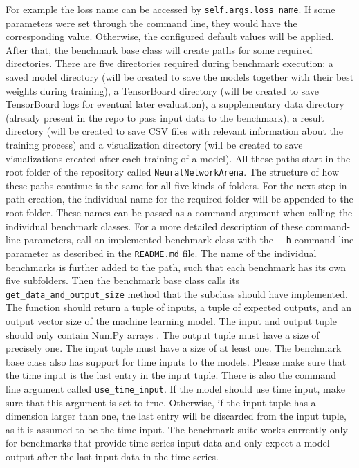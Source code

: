 \documentclass[draft,final]{vutinfth} %
\begin{document}
    For example the loss name can be accessed by \texttt{self.args.loss\_name}.
    If some parameters were set through the command line, they would have the corresponding value. Otherwise, the configured default values will be applied.
    After that, the benchmark base class will create paths for some required directories.
    There are five directories required during benchmark execution: a saved model directory (will be created to save the models together with their best weights during training), a TensorBoard directory (will be created to save TensorBoard logs for eventual later evaluation), a supplementary data directory (already present in the repo to pass input data to the benchmark), a result directory (will be created to save CSV files with relevant information about the training process) and a visualization directory (will be created to save visualizations created after each training of a model).
    All these paths start in the root folder of the repository called \texttt{NeuralNetworkArena}.
    The structure of how these paths continue is the same for all five kinds of folders.
    For the next step in path creation, the individual name for the required folder will be appended to the root folder.
    These names can be passed as a command argument when calling the individual benchmark classes.
    For a more detailed description of these command-line parameters, call an implemented benchmark class with the \texttt{-{}-h} command line parameter as described in the \texttt{README.md} file.
    The name of the individual benchmarks is further added to the path, such that each benchmark has its own five subfolders.
    Then the benchmark base class calls its \texttt{get\_data\_and\_output\_size} method that the subclass should have implemented.
    The function should return a tuple of inputs, a tuple of expected outputs, and an output vector size of the machine learning model.
    The input and output tuple should only contain NumPy arrays \cite{numpy}. The output tuple must have a size of precisely one.
    The input tuple must have a size of at least one.
    The benchmark base class also has support for time inputs to the models.
    Please make sure that the time input is the last entry in the input tuple.
    There is also the command line argument called \texttt{use\_time\_input}.
    If the model should use time input, make sure that this argument is set to true.
    Otherwise, if the input tuple has a dimension larger than one, the last entry will be discarded from the input tuple, as it is assumed to be the time input.
    The benchmark suite works currently only for benchmarks that provide time-series input data and only expect a model output after the last input data in the time-series.
\end{document}
